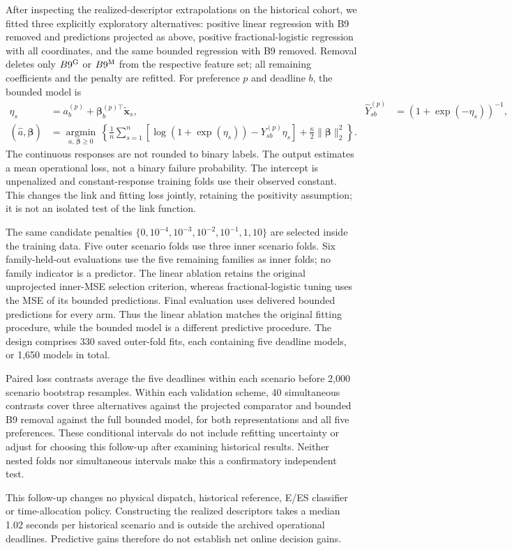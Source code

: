 After inspecting the realized-descriptor extrapolations on the historical
cohort, we fitted three explicitly exploratory alternatives: positive linear
regression with B9 removed and predictions projected as above, positive
fractional-logistic regression with all coordinates, and the same bounded
regression with B9 removed. Removal deletes only $B9^{\rm G}$ or $B9^{\rm M}$
from the respective feature set; all remaining coefficients and the penalty
are refitted. For preference $p$ and deadline $b$, the bounded model is
\begin{align}
 \eta_s&=a_b^{(p)}+\boldsymbol\beta_b^{(p)\top}\widetilde{\boldsymbol x}_s,
 &\widehat Y^{(p)}_{sb}&=(1+\exp(-\eta_s))^{-1},\nonumber\\
 (\widehat a,\widehat{\boldsymbol\beta})
 &=\underset{a,\,\boldsymbol\beta\geq0}{\operatorname{argmin}}\,
 \left\{\frac1n\sum_{s=1}^n
 [\log(1+\exp(\eta_s))-Y^{(p)}_{sb}\eta_s]
 +\frac{\kappa}{2}\|\boldsymbol\beta\|_2^2\right\}.
 \label{eq:bounded_fractional}
\end{align}
The continuous responses are not rounded to binary labels. The output
estimates a mean operational loss, not a binary failure probability.
The intercept is unpenalized and constant-response training folds use their
observed constant. This changes the link and fitting loss jointly, retaining
the positivity assumption; it is not an isolated test of the link function.

The same candidate penalties $\{0,10^{-4},10^{-3},10^{-2},10^{-1},1,10\}$
are selected inside the training data. Five outer scenario folds use three
inner scenario folds. Six family-held-out evaluations use the five remaining
families as inner folds; no family indicator is a predictor. The linear
ablation retains the original unprojected inner-MSE selection criterion,
whereas fractional-logistic tuning uses the MSE of its bounded predictions.
Final evaluation uses delivered bounded predictions for every arm. Thus the
linear ablation matches the original fitting procedure, while the bounded
model is a different predictive procedure. The design comprises 330 saved
outer-fold fits, each containing five deadline models, or 1,650 models in total.

Paired loss contrasts average the five deadlines within each scenario before
2,000 scenario bootstrap resamples. Within each validation scheme, 40
simultaneous contrasts cover three alternatives against the projected
comparator and bounded B9 removal against the full bounded model, for both
representations and all five preferences. These conditional intervals do not
include refitting uncertainty or adjust for choosing this follow-up after
examining historical results. Neither nested folds nor simultaneous intervals
make this a confirmatory independent test.

This follow-up changes no physical dispatch, historical reference, E/ES
classifier or time-allocation policy. Constructing the realized descriptors
takes a median 1.02 seconds per historical scenario and is outside the
archived operational deadlines. Predictive gains therefore do not establish
net online decision gains.
